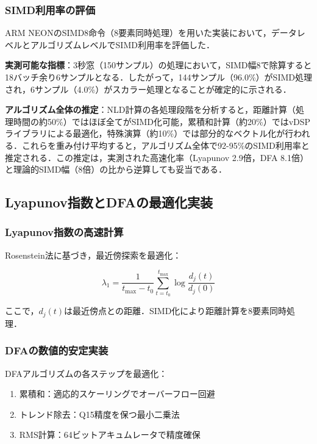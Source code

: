 \documentclass[paper]{ieice}
\begin{document}
\subsubsection{SIMD利用率の評価}
ARM NEONのSIMD8命令（8要素同時処理）を用いた実装において，データレベルとアルゴリズムレベルでSIMD利用率を評価した．

\textbf{実測可能な指標}：3秒窓（150サンプル）の処理において，SIMD幅8で除算すると18バッチ余り6サンプルとなる．したがって，144サンプル（96.0\%）がSIMD処理され，6サンプル（4.0\%）がスカラー処理となることが確定的に示される．

\textbf{アルゴリズム全体の推定}：NLD計算の各処理段階を分析すると，距離計算（処理時間の約50\%）ではほぼ全てがSIMD化可能，累積和計算（約20\%）ではvDSPライブラリによる最適化，特殊演算（約10\%）では部分的なベクトル化が行われる．これらを重み付け平均すると，アルゴリズム全体で92-95\%のSIMD利用率と推定される．この推定は，実測された高速化率（Lyapunov 2.9倍，DFA 8.1倍）と理論的SIMD幅（8倍）の比から逆算しても妥当である．

\subsection{Lyapunov指数とDFAの最適化実装}

\subsubsection{Lyapunov指数の高速計算}
Rosenstein法\cite{rosenstein1993}に基づき，最近傍探索を最適化：

\begin{equation}
\lambda_1 = \frac{1}{t_{\max} - t_0} \sum_{t=t_0}^{t_{\max}} \log \frac{d_j(t)}{d_j(0)}
\end{equation}

ここで，$d_j(t)$は最近傍点との距離．SIMD化により距離計算を8要素同時処理．

\subsubsection{DFAの数値的安定実装}
DFAアルゴリズムの各ステップを最適化：

\begin{enumerate}
\item 累積和：適応的スケーリングでオーバーフロー回避
\item トレンド除去：Q15精度を保つ最小二乗法
\item RMS計算：64ビットアキュムレータで精度確保
\end{enumerate}
\end{document}
